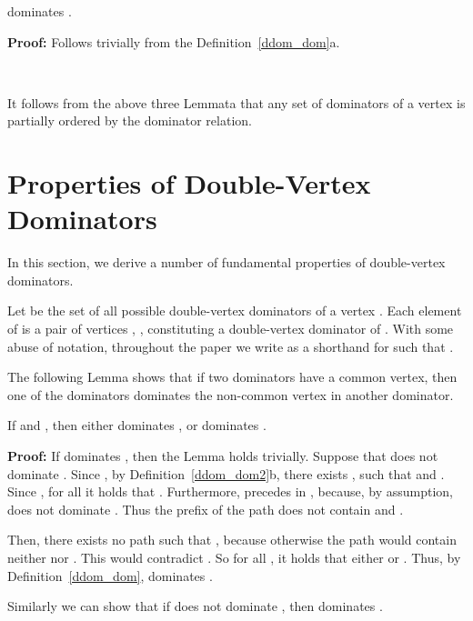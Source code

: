 \documentclass{llncs}
\begin{document}
\begin{lemma} \label{ddom_mp03}
 dominates .
\end{lemma}
{\bf Proof:}
Follows trivially from the Definition~\ref{ddom_dom}a. 
\begin{flushright}
 \\
\end{flushright}

It follows from the above three Lemmata that any set of dominators of
a vertex  is partially ordered by the dominator relation.



\section{Properties of Double-Vertex Dominators} \label{sec_dd}
\label{ddom_ddp}

In this section, we derive a number of fundamental properties of
double-vertex dominators. 





Let  be the set of all possible double-vertex dominators of a vertex . 
Each element of  is a pair of vertices , , constituting a double-vertex dominator of . 
With some abuse of notation, throughout the paper we write  as a shorthand for
 such that .

The following Lemma shows that if two dominators have a common vertex, 
then one of the dominators dominates the non-common vertex in another dominator.

\begin{lemma} \label{ddom_p01}
If  and ,
then either  dominates , or  dominates .
\end{lemma}
{\bf Proof:} If  dominates , then the Lemma
holds trivially. Suppose that  does not dominate . Since
, by Definition~\ref{ddom_dom2}b, there exists , such that  and . Since
, for all    it holds that . Furthermore,  precedes  in , because, by
assumption,  does not dominate . Thus the prefix  of the path  does not contain  and .

Then, there exists no path  such that , because otherwise the path  would contain neither
 nor . This would contradict . So
for all , it holds that either  or . Thus, by Definition~\ref{ddom_dom},  dominates .

Similarly we can show that if  does not dominate , then
 dominates .
\begin{flushright}

\end{flushright}
\end{document}
